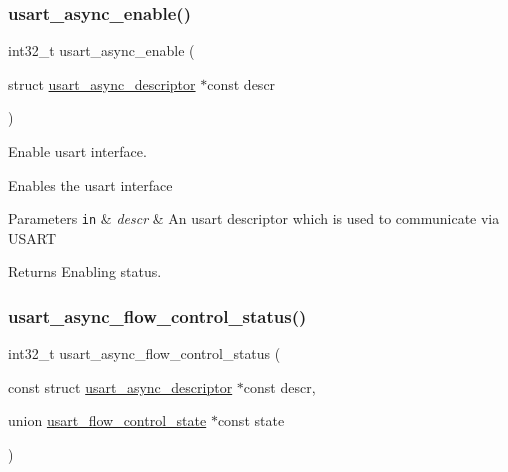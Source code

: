 \subsubsection{\texorpdfstring{usart\+\_\+async\+\_\+enable()}{usart\_async\_enable()}}
{\footnotesize\ttfamily int32\+\_\+t usart\+\_\+async\+\_\+enable (\begin{DoxyParamCaption}\item[{struct \hyperlink{structusart__async__descriptor}{usart\+\_\+async\+\_\+descriptor} $\ast$const}]{descr }\end{DoxyParamCaption})}



Enable usart interface. 

Enables the usart interface


\begin{DoxyParams}[1]{Parameters}
\mbox{\tt in}  & {\em descr} & An usart descriptor which is used to communicate via U\+S\+A\+RT\\
\hline
\end{DoxyParams}
\begin{DoxyReturn}{Returns}
Enabling status. 
\end{DoxyReturn}
\mbox{\label{group__doc__driver__hal__usart__async_gaf451cb5a13be66b9357354b1b503c892}} 
\subsubsection{\texorpdfstring{usart\+\_\+async\+\_\+flow\+\_\+control\+\_\+status()}{usart\_async\_flow\_control\_status()}}
{\footnotesize\ttfamily int32\+\_\+t usart\+\_\+async\+\_\+flow\+\_\+control\+\_\+status (\begin{DoxyParamCaption}\item[{const struct \hyperlink{structusart__async__descriptor}{usart\+\_\+async\+\_\+descriptor} $\ast$const}]{descr,  }\item[{union \hyperlink{unionusart__flow__control__state}{usart\+\_\+flow\+\_\+control\+\_\+state} $\ast$const}]{state }\end{DoxyParamCaption})}



